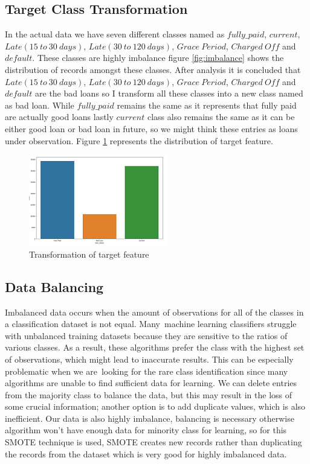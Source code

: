 \documentclass[12pt]{article}
\begin{document}
\subsection{Target Class Transformation}
In the actual data we have seven different classes named as $fully\_paid$, $current$, $Late(15\ to\ 30\ days)$, $Late(30\ to\ 120\ days)$, $Grace\ Period$, $Charged\ Off$ and $default$. These classes are highly imbalance figure \ref{fig:imbalance} shows the distribution of records amongst these classes. After analysis it is concluded that $Late(15\ to\ 30\ days)$, $Late(30\ to\ 120\ days)$, $Grace\ Period$, $Charged\ Off$ and $default$ are the bad loans so I transform all these classes into a new class named as bad loan. While $fully\_paid$ remains the same as it represents that fully paid are actually good loans lastly $current$ class also remains the same as it can be either good loan or bad loan in future, so we might think these entries as loans under observation. Figure \ref{fig:new_classes} represents the distribution of target feature.
\begin{figure}[h!]
	\centering
	\includegraphics{classes.png}
	\caption{Transformation of target feature}
	\label{fig:new_classes}
\end{figure}

\subsection{Data Balancing}
Imbalanced data occurs when the amount of observations for all of the classes in a classification dataset is not equal. Many machine learning classifiers struggle with unbalanced training datasets because they are sensitive to the ratios of various classes. As a result, these algorithms prefer the class with the highest set of observations, which might lead to inaccurate results. This can be especially problematic when we are looking for the rare class identification since many algorithms are unable to find sufficient data for learning. We can delete entries from the majority class to balance the data, but this may result in the loss of some crucial information; another option is to add duplicate values, which is also inefficient. Our data is also highly imbalance, balancing is necessary otherwise algorithm won't have enough data for minority class for learning, so for this SMOTE technique is used, SMOTE creates new records rather than duplicating the records from the dataset which is very good for highly imbalanced data.
\end{document}
